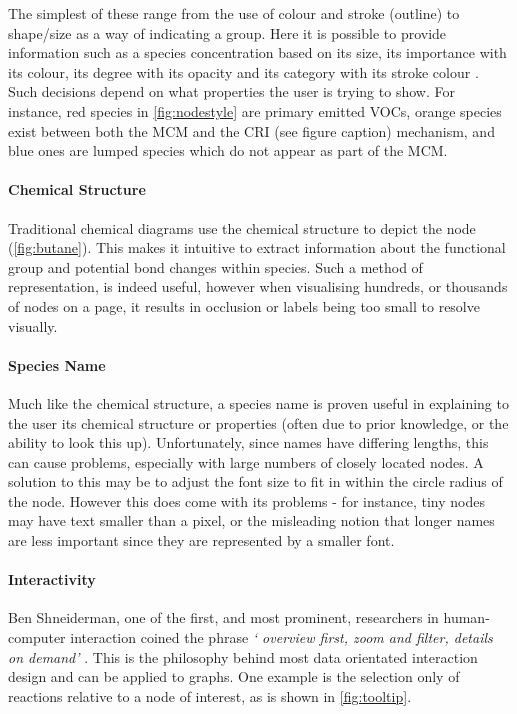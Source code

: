 The simplest of these range from the use of colour and stroke (outline) to shape/size as a way of indicating a group. Here it is possible to provide information such as a species concentration based on its size, its importance with its colour, its degree with its opacity and its category with its stroke colour \citep{colour,brightness}. Such decisions depend on what properties the user is trying to show. For instance, red species in \autoref{fig:nodestyle} are primary emitted VOCs, orange species exist between both the MCM and the CRI (see figure caption) mechanism, and blue ones are lumped species which do not appear as part of the MCM.


\paragraph*{\color{c1}Chemical Structure}
Traditional chemical diagrams use the chemical structure to depict the node (\autoref{fig:butane}). This makes it intuitive to extract information about the functional group and potential bond changes within species. Such a method of representation, is indeed useful, however when visualising hundreds, or thousands of nodes on a page, it results in occlusion or labels being too small to resolve visually.

\paragraph*{\color{c2}Species Name}

Much like the chemical structure, a species name is proven useful in explaining to the user its chemical structure or properties (often due to prior knowledge, or the ability to look this up). Unfortunately, since names have differing lengths, this can cause problems, especially with large numbers of closely located nodes. A solution to this may be to adjust the font size to fit in within the circle radius of the node. However this does come with its problems - for instance, tiny nodes may have text smaller than a pixel, or the misleading notion that longer names are less important since they are represented by a smaller font.


\paragraph*{\color{c3}Interactivity}

Ben Shneiderman, one of the first, and most prominent, researchers in human-computer interaction coined the phrase \emph{` overview first, zoom and filter, details on demand'}  \citep{mantra}. This is the philosophy behind most data orientated interaction design and can be applied to graphs. One example is the selection only of reactions relative to a node of interest, as is shown in \autoref{fig:tooltip}.

